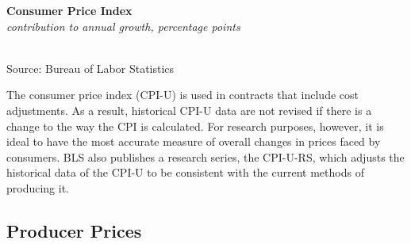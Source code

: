 \documentclass{report}
\newcommand{\tbllink}[1]{\href{https://raw.githubusercontent.com/bdecon/US-chartbook/master/chartbook/data/#1}{\faTable}}
\newcommand{\barylab}[2]{yticklabel style={text width=#1, align=right, 
		style={black!70}, text height=#2},}
\newcommand{\bbar}[2]{extra #1 ticks = {{#2}}, extra #1 tick labels = ,
		extra #1 tick style = {grid=major, grid style={thick, black!25}},}
\newcommand{\barplotnogrid}{xbar=0pt, axis line style={draw=none},
	    yticklabel style={align=left, anchor=east},
      		xmajorticks=false, ymajorgrids=false,   
	    ytick=data, tickwidth=0pt, area legend, reverse legend,
	    nodes near coords, nodes near coords align={horizontal},}
\begin{document}
{{{{{{{{{\begin{minipage}{0.3\textwidth}
 
\end{minipage} \hspace{6mm}
\begin{minipage}{0.4\textwidth}
\noindent \normalsize \textbf{Consumer Price Index}\\
\footnotesize{\textit{contribution to annual growth, percentage points}}\\ 
\noindent \hspace*{-7mm} \\
\footnotesize{Source: Bureau of Labor Statistics} \hfill \tbllink{cpi_comp.csv}
\end{minipage}

\newpage

\begin{minipage}{0.76\textwidth}
\small The consumer price index (CPI-U) is used in contracts that include cost adjustments. As a result, historical CPI-U data are not revised if there is a change to the way the CPI is calculated. For research purposes, however, it is ideal to have the most accurate measure of overall changes in prices faced by consumers. BLS also publishes a research series, the CPI-U-RS, which adjusts the historical data of the CPI-U to be consistent with the current methods of producing it. 
\end{minipage}
\subsection*{\color{black!70} \seriffont Producer Prices}

}}}}}}}}}
\end{document}
